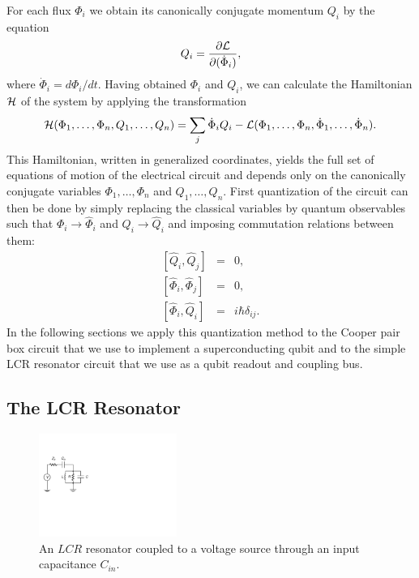 %
For each flux $\Phi_i$ we obtain its canonically conjugate momentum $Q_i$ by the equation
%
\begin{equation}
Q_i = \frac{\partial \begin{mathcal}L\end{mathcal}}{\partial(\dot{\Phi}_i)}, \label{eq:canonical_momentum}
\end{equation}
%
where $\dot{\Phi}_i=d\Phi_i/dt$. Having obtained $\Phi_i$ and $Q_i$, we can calculate the Hamiltonian $\begin{mathcal}H\end{mathcal}$ of the system by applying the transformation
%
\begin{equation}
\begin{mathcal}H\end{mathcal}(\Phi_1,\hdots,\Phi_n,Q_1,\hdots,Q_n) = \sum\limits_j \dot{\Phi}_i Q_i - \begin{mathcal}L\end{mathcal}(\Phi_1,\hdots,\Phi_n,\dot{\Phi}_1,\hdots,\dot{\Phi}_n). \label{eq:l_to_h}
\end{equation}
%
This Hamiltonian, written in generalized coordinates, yields the full set of equations of motion of the electrical circuit and depends only on the canonically conjugate variables $\Phi_{1},\hdots,\Phi_n$ and $Q_1,\hdots,Q_n$. First quantization of the circuit can then be done by simply replacing the classical variables by quantum observables such that $\Phi_i\to\hat{\Phi}_i$ and $Q_i\to\hat{Q}_i$ and imposing commutation relations between them:
%
\begin{eqnarray}
\left[\hat{Q}_i,\hat{Q}_j\right] & = & 0, \\
\left[\hat{\Phi}_i,\hat{\Phi}_j \right] & = & 0, \\
\left[\hat{\Phi}_i,\hat{Q}_i\right] & = & i\hbar\delta_{ij}. \label{eq:quantization_commutation_relations}
\end{eqnarray}
% 
In the following sections we apply this quantization method to the Cooper pair box circuit that we use to implement a superconducting qubit and to the simple LCR resonator circuit that we use as a qubit readout and coupling bus.

\subsection{The LCR Resonator}

\begin{figure}
	\centering
	\includegraphics[width=0.4\textwidth]{"./material/figures/introduction/lcr_resonator"}
	\caption[]{An $LCR$ resonator coupled to a voltage source through an input capacitance $C_{in}$.}
	\label{fig:lcr_resonator}
\end{figure}

